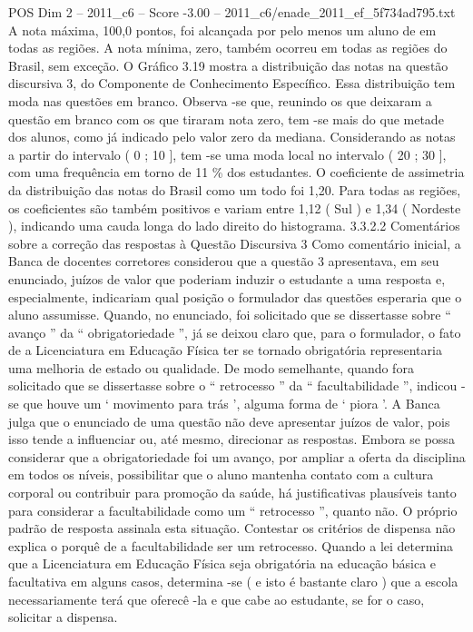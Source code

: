\begin{textsample}{POS Dim 2 – 2011\_c6 – Score -3.00 – 2011\_c6/enade\_2011\_ef\_5f734ad795.txt}
A nota máxima, 100,0 pontos, foi alcançada por pelo menos um aluno de em todas as regiões.
A nota mínima, zero, também ocorreu em todas as regiões do Brasil, sem exceção.
O Gráfico 3.19 mostra a distribuição das notas na questão discursiva 3, do Componente de Conhecimento Específico.
Essa distribuição tem moda nas questões em branco.
Observa -se que, reunindo os que deixaram a questão em branco com os que tiraram nota zero, tem -se mais do que metade dos alunos, como já indicado pelo valor zero da mediana.
Considerando as notas a partir do intervalo ( 0 ; 10 ], tem -se uma moda local no intervalo ( 20 ; 30 ], com uma frequência em torno de 11 \% dos estudantes.
O coeficiente de assimetria da distribuição das notas do Brasil como um todo foi 1,20.
Para todas as regiões, os coeficientes são também positivos e variam entre 1,12 ( Sul ) e 1,34 ( Nordeste ), indicando uma cauda longa do lado direito do histograma. 3.3.2.2 Comentários sobre a correção das respostas à Questão Discursiva 3 Como comentário inicial, a Banca de docentes corretores considerou que a questão 3 apresentava, em seu enunciado, juízos de valor que poderiam induzir o estudante a uma resposta e, especialmente, indicariam qual posição o formulador das questões esperaria que o aluno assumisse.
Quando, no enunciado, foi solicitado que se dissertasse sobre “ avanço ” da “ obrigatoriedade ”, já se deixou claro que, para o formulador, o fato de a Licenciatura em Educação Física ter se tornado obrigatória representaria uma melhoria de estado ou qualidade.
De modo semelhante, quando fora solicitado que se dissertasse sobre o “ retrocesso ” da “ facultabilidade ”, indicou -se que houve um ‘ movimento para trás ’, alguma forma de ‘ piora ’.
A Banca julga que o enunciado de uma questão não deve apresentar juízos de valor, pois isso tende a influenciar ou, até mesmo, direcionar as respostas.
Embora se possa considerar que a obrigatoriedade foi um avanço, por ampliar a oferta da disciplina em todos os níveis, possibilitar que o aluno mantenha contato com a cultura corporal ou contribuir para promoção da saúde, há justificativas plausíveis tanto para considerar a facultabilidade como um “ retrocesso ”, quanto não.
O próprio padrão de resposta assinala esta situação.
Contestar os critérios de dispensa não explica o porquê de a facultabilidade ser um retrocesso.
Quando a lei determina que a Licenciatura em Educação Física seja obrigatória na educação básica e facultativa em alguns casos, determina -se ( e isto é bastante claro ) que a escola necessariamente terá que oferecê -la e que cabe ao estudante, se for o caso, solicitar a dispensa.

\end{textsample}
